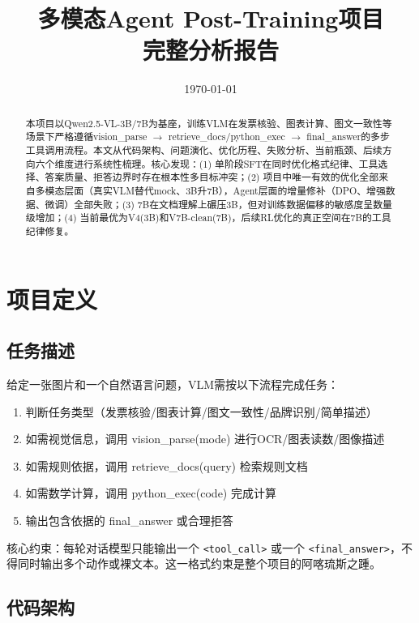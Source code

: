 \documentclass[fontset=none,11pt,a4paper]{ctexart}
\title{多模态Agent Post-Training项目\\完整分析报告}
\author{}
\date{\today}
\begin{document}
\maketitle

\begin{abstract}
本项目以Qwen2.5-VL-3B/7B为基座，训练VLM在发票核验、图表计算、图文一致性等场景下严格遵循vision\_parse $\to$ retrieve\_docs/python\_exec $\to$ final\_answer的多步工具调用流程。本文从代码架构、问题演化、优化历程、失败分析、当前瓶颈、后续方向六个维度进行系统性梳理。核心发现：(1) 单阶段SFT在同时优化格式纪律、工具选择、答案质量、拒答边界时存在根本性多目标冲突；(2) 项目中唯一有效的优化全部来自多模态层面（真实VLM替代mock、3B升7B），Agent层面的增量修补（DPO、增强数据、微调）全部失败；(3) 7B在文档理解上碾压3B，但对训练数据偏移的敏感度呈数量级增加；(4) 当前最优为V4(3B)和V7B-clean(7B)，后续RL优化的真正空间在7B的工具纪律修复。
\end{abstract}

\tableofcontents

\section{项目定义}

\subsection{任务描述}

给定一张图片和一个自然语言问题，VLM需按以下流程完成任务：
\begin{enumerate}[nosep]
    \item 判断任务类型（发票核验/图表计算/图文一致性/品牌识别/简单描述）
    \item 如需视觉信息，调用 vision\_parse(mode) 进行OCR/图表读数/图像描述
    \item 如需规则依据，调用 retrieve\_docs(query) 检索规则文档
    \item 如需数学计算，调用 python\_exec(code) 完成计算
    \item 输出包含依据的 final\_answer 或合理拒答
\end{enumerate}

核心约束：每轮对话模型只能输出一个 \texttt{<tool\_call>} 或一个 \texttt{<final\_answer>}，不得同时输出多个动作或裸文本。这一格式约束是整个项目的阿喀琉斯之踵。

\subsection{代码架构}
\end{document}
